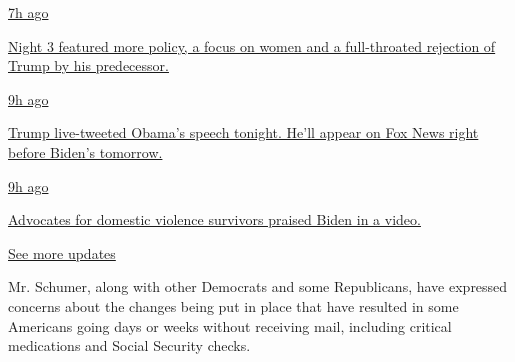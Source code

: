 \href{https://www.nytimes3xbfgragh.onion/live/2020/08/19/us/dnc-convention-election?action=click\&pgtype=Article\&state=default\&region=MAIN_CONTENT_1\&context=storylines_live_updates\#night-3-featured-more-policy-a-focus-on-women-and-a-full-throated-rejection-of-trump-by-his-predecessor}{7h
ago}

\href{https://www.nytimes3xbfgragh.onion/live/2020/08/19/us/dnc-convention-election?action=click\&pgtype=Article\&state=default\&region=MAIN_CONTENT_1\&context=storylines_live_updates\#night-3-featured-more-policy-a-focus-on-women-and-a-full-throated-rejection-of-trump-by-his-predecessor}{Night
3 featured more policy, a focus on women and a full-throated rejection
of Trump by his predecessor.}

\href{https://www.nytimes3xbfgragh.onion/live/2020/08/19/us/dnc-convention-election?action=click\&pgtype=Article\&state=default\&region=MAIN_CONTENT_1\&context=storylines_live_updates\#trump-live-tweeted-obamas-speech-tonight-hell-appear-on-fox-news-right-before-bidens-tomorrow}{9h
ago}

\href{https://www.nytimes3xbfgragh.onion/live/2020/08/19/us/dnc-convention-election?action=click\&pgtype=Article\&state=default\&region=MAIN_CONTENT_1\&context=storylines_live_updates\#trump-live-tweeted-obamas-speech-tonight-hell-appear-on-fox-news-right-before-bidens-tomorrow}{Trump
live-tweeted Obama's speech tonight. He'll appear on Fox News right
before Biden's tomorrow.}

\href{https://www.nytimes3xbfgragh.onion/live/2020/08/19/us/dnc-convention-election?action=click\&pgtype=Article\&state=default\&region=MAIN_CONTENT_1\&context=storylines_live_updates\#advocates-for-domestic-violence-survivors-praised-biden-in-a-video}{9h
ago}

\href{https://www.nytimes3xbfgragh.onion/live/2020/08/19/us/dnc-convention-election?action=click\&pgtype=Article\&state=default\&region=MAIN_CONTENT_1\&context=storylines_live_updates\#advocates-for-domestic-violence-survivors-praised-biden-in-a-video}{Advocates
for domestic violence survivors praised Biden in a video.}

\href{https://www.nytimes3xbfgragh.onion/live/2020/08/19/us/dnc-convention-election?action=click\&pgtype=Article\&state=default\&region=MAIN_CONTENT_1\&context=storylines_live_updates}{See
more updates}

Mr. Schumer, along with other Democrats and some Republicans, have
expressed concerns about the changes being put in place that have
resulted in some Americans going days or weeks without receiving mail,
including critical medications and Social Security checks.


